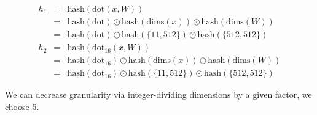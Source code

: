 \documentclass[aspectratio=169]{beamer}					%
\begin{document}
\begin{frame}{}
\begin{eqnarray*}
h_1 &=& \mathrm{hash}(\mathrm{dot}(x,W))\\
 &=& \mathrm{hash}(\mathrm{dot}) \odot \mathrm{hash}(\mathrm{dims}(x)) \odot \mathrm{hash}(\mathrm{dims}(W))\\
 &=& \mathrm{hash}(\mathrm{dot}) \odot \mathrm{hash}(\{11,512\}) \odot \mathrm{hash}(\{512,512\}) \\[5mm]
h_2 &=& \mathrm{hash}(\mathrm{dot_{16}}(x,W))\\
 &=& \mathrm{hash}(\mathrm{dot_{16}}) \odot \mathrm{hash}(\mathrm{dims}(x)) \odot \mathrm{hash}(\mathrm{dims}(W))\\
 &=& \mathrm{hash}(\mathrm{dot_{16}}) \odot \mathrm{hash}(\{11,512\}) \odot \mathrm{hash}(\{512,512\})
\end{eqnarray*}

\vspace{5mm}

We can decrease granularity via integer-dividing dimensions by a given factor, we choose 5. 
\end{frame}
\end{document}

